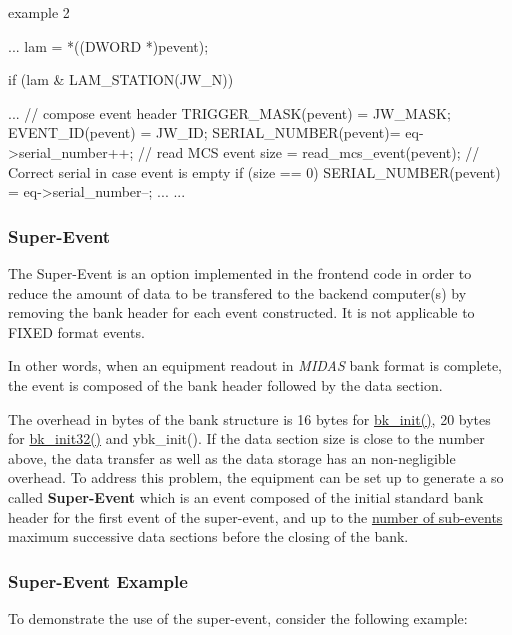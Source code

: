 \begin{DoxyItemize}
\item example 2
\end{DoxyItemize}


\begin{DoxyCode}
  ...
  lam = *((DWORD *)pevent);

  if (lam & LAM_STATION(JW_N))

  {
    ...
    // compose event header
    TRIGGER_MASK(pevent) = JW_MASK;
    EVENT_ID(pevent)     = JW_ID;
    SERIAL_NUMBER(pevent)= eq->serial_number++;
    // read MCS event
    size = read_mcs_event(pevent);
    // Correct serial in case event is empty 
    if (size == 0)
      SERIAL_NUMBER(pevent) = eq->serial_number--;
    ...
  }
  ...
\end{DoxyCode}




 \par




\par
 \label{index_end}
\hypertarget{index_end}{}
 \subsubsection{Super-\/Event}\label{FE_Super_Event}
\par
 

\par
 \label{FE_Super_Event_idx_event_readout_super-event}
\hypertarget{FE_Super_Event_idx_event_readout_super-event}{}
 \label{FE_Super_Event_idx_super-event}
\hypertarget{FE_Super_Event_idx_super-event}{}


The Super-\/Event is an option implemented in the frontend code in order to reduce the amount of data to be transfered to the backend computer(s) by removing the bank header for each event constructed. It is not applicable to FIXED format events.

In other words, when an equipment readout in {\itshape MIDAS\/} bank format is complete, the event is composed of the bank header followed by the data section.

The overhead in bytes of the bank structure is 16 bytes for \hyperlink{group__bkfunctionc_gac6fadde40824dbf7bd70abedd29be2bd}{bk\_\-init()}, 20 bytes for \hyperlink{group__bkfunctionc_gae7cbf587db63fcdf66dd18b29f08b6d2}{bk\_\-init32()} and ybk\_\-init(). If the data section size is close to the number above, the data transfer as well as the data storage has an non-\/negligible overhead. To address this problem, the equipment can be set up to generate a so called {\bfseries  Super-\/Event } which is an event composed of the initial standard bank header for the first event of the super-\/event, and up to the \hyperlink{FE_table_FE_tbl_NumSubevents}{number of sub-\/events} maximum successive data sections before the closing of the bank.\hypertarget{FE_Super_Event_FE_Super_Event_example}{}\subsubsection{Super-\/Event Example}\label{FE_Super_Event_FE_Super_Event_example}
To demonstrate the use of the super-\/event, consider the following example:


